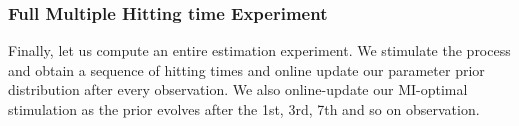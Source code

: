 \subsubsection{Full Multiple Hitting time Experiment}
Finally, let us compute an entire estimation experiment. We stimulate
the process and obtain a sequence
of hitting times and online update our parameter prior distribution after
every observation. We also online-update our MI-optimal stimulation as
the prior evolves after the 1st, 3rd, 7th and so on observation. 

 
 
 



